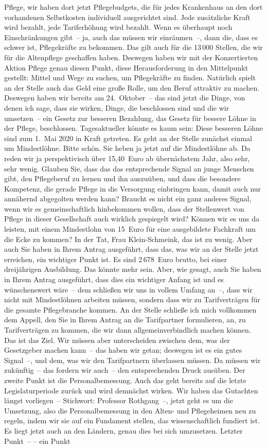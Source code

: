 \documentclass{article}
\begin{document}
Pflege, wir haben dort jetzt Pflegebudgets, die für jedes Krankenhaus an den dort vorhandenen Selbstkosten individuell ausgerichtet sind. Jede zusätzliche Kraft wird bezahlt, jede Tariferhöhung wird bezahlt.  Wenn es überhaupt noch Einschränkungen gibt – ja, auch das müssen wir einräumen –, dann die, dass es schwer ist, Pflegekräfte zu bekommen.  Das gilt auch für die 13 000 Stellen, die wir für die Altenpflege geschaffen haben. Deswegen haben wir mit der Konzertierten Aktion Pflege genau diesen Punkt, diese Herausforderung in den Mittelpunkt gestellt: Mittel und Wege zu suchen, um Pflegekräfte zu finden. Natürlich spielt an der Stelle auch das Geld eine große Rolle, um den Beruf attraktiv zu machen. Deswegen haben wir bereits am 24. Oktober – das sind jetzt die Dinge, von denen ich sage, dass sie wirken, Dinge, die beschlossen sind und die wir umsetzen – ein Gesetz zur besseren Bezahlung, das Gesetz für bessere Löhne in der Pflege, beschlossen. Tagesaktueller könnte es kaum sein: Diese besseren Löhne sind zum 1. Mai 2020 in Kraft getreten. Es geht an der Stelle zunächst einmal um Mindestlöhne. Bitte schön. Sie heben ja jetzt auf die Mindestlöhne ab. Da reden wir ja perspektivisch über 15,40 Euro ab übernächstem Jahr, also sehr, sehr wenig. Glauben Sie, dass das das entsprechende Signal an junge Menschen gibt, den Pflegeberuf zu lernen und ihn auszuüben, und dass die besondere Kompetenz, die gerade Pflege in die Versorgung einbringen kann, damit auch nur annähernd abgegolten werden kann? Braucht es nicht ein ganz anderes Signal, wenn wir es gemeinschaftlich hinbekommen wollen, dass der Stellenwert von Pflege in dieser Gesellschaft auch wirklich gespiegelt wird? Können wir es uns da leisten, mit einem Mindestlohn von 15 Euro für eine ausgebildete Fachkraft um die Ecke zu kommen?  In der Tat, Frau Klein-Schmeink, das ist zu wenig. Aber auch Sie haben in Ihrem Antrag ausgeführt, dass das, was wir an der Stelle jetzt erreichen, ein wichtiger Punkt ist. Es sind 2 678 Euro brutto, bei einer dreijährigen Ausbildung. Das könnte mehr sein. Aber, wie gesagt, auch Sie haben in Ihrem Antrag ausgeführt, dass dies ein wichtiger Anfang ist und es wünschenswert wäre – dem schließen wir uns in vollem Umfang an –, dass wir nicht mit Mindestlöhnen arbeiten müssen,  sondern dass wir zu Tarifverträgen für die gesamte Pflegebranche kommen. An der Stelle schließe ich mich vollkommen dem Appell, den Sie in Ihrem Antrag an die Tarifpartner formulieren, an, zu Tarifverträgen zu kommen, die wir dann allgemeinverbindlich machen können. Das ist das Ziel.  Wir müssen aber unterscheiden zwischen dem, was der Gesetzgeber machen kann – das haben wir getan; deswegen ist es ein gutes Signal –, und dem, was wir den Tarifpartnern überlassen müssen.  Da müssen wir zukünftig – das fordern wir auch – den entsprechenden Druck ausüben. Der zweite Punkt ist die Personalbemessung. Auch das geht bereits auf die letzte Legislaturperiode zurück und wird demnächst wirken. Wir haben das Gutachten längst vorliegen – Stichwort: Professor Rothgang –, jetzt geht es um die Umsetzung, also die Personalbemessung in den Alten- und Pflegeheimen neu zu regeln, indem wir sie auf ein Fundament stellen, das wissenschaftlich fundiert ist. Es liegt jetzt auch an den Ländern, genau dies bei sich umzusetzen. Letzter Punkt – – ein Punkt 
\end{document}
